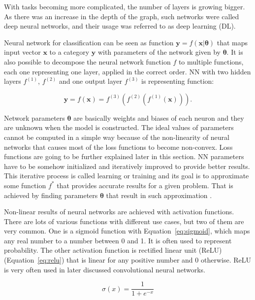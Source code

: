 With tasks becoming more complicated, the number of layers is growing bigger. As there was an increase in the depth of the graph, such networks were called deep neural networks, and their usage was referred to as deep learning (DL).

Neural network for classification can be seen as function $\pmb y=f(\pmb x | \pmb \theta)$ that maps input vector $\pmb x$ to a category $\pmb y$ with parameters of the network given by $\pmb \theta$. It is also possible to decompose the neural network function $f$ to multiple functions, each one representing one layer, applied in the correct order. NN with two hidden layers $f^{(1)}$, $f^{(2)}$ and one output layer $f^{(3)}$ is representing function:

\begin{equation}
    \label{eq:forward-prop}
    \pmb y = f(\pmb x) = f^{(3)}(f^{(2)}(f^{(1)}(\pmb x))).
\end{equation}

Network parameters $\pmb \theta$ are basically weights and biases of each neuron and they are unknown when the model is constructed. The ideal values of parameters cannot be computed in a simple way because of the non-linearity of neural networks that causes most of the loss functions to become non-convex. Loss functions are going to be further explained later in this section. NN parameters have to be somehow initialized and iteratively improved to provide better results. This iterative process is called learning or training and its goal is to approximate some function $f^*$ that provides accurate results for a given problem. That is achieved by finding parameters $\pmb \theta$ that result in such approximation \cite{Goodfellow-et-al-2016}.

Non-linear results of neural networks are achieved with activation functions. There are lots of various functions with different use cases, but two of them are very common. One is a sigmoid function with Equation~\ref{eq:sigmoid}, which maps any real number to a number between 0 and 1. It is often used to represent probability. The other activation function is rectified linear unit (ReLU) (Equation~\ref{eq:relu}) that is linear for any positive number and 0 otherwise. ReLU is very often used in later discussed convolutional neural networks.

\begin{equation}
    \label{eq:sigmoid}
    \sigma (x) = \frac{1}{1 + e^{-x}}
\end{equation}

